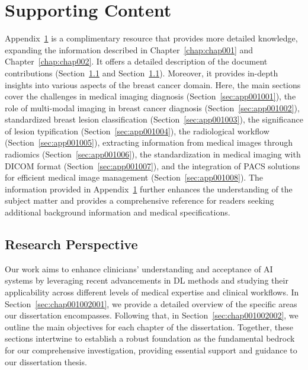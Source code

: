 \chapter{Supporting Content}
\label{chap:app001}

Appendix~\ref{chap:app001} is a complimentary resource that provides more detailed knowledge, expanding the information described in Chapter~\ref{chap:chap001} and Chapter~\ref{chap:chap002}.
It offers a detailed description of the document contributions (Section~\ref{sec:chap001002} and Section~\ref{sec:chap001002}).
Moreover, it provides in-depth insights into various aspects of the breast cancer domain.
Here, the main sections cover the challenges in medical imaging diagnosis (Section~\ref{sec:app001001}), the role of multi-modal imaging in breast cancer diagnosis (Section~\ref{sec:app001002}), standardized breast lesion classification (Section~\ref{sec:app001003}), the significance of lesion typification (Section~\ref{sec:app001004}), the radiological workflow (Section~\ref{sec:app001005}), extracting information from medical images through radiomics (Section~\ref{sec:app001006}), the standardization in medical imaging with \ac{DICOM} format (Section~\ref{sec:app001007}), and the integration of \ac{PACS} solutions for efficient medical image management (Section~\ref{sec:app001008}).
The information provided in Appendix~\ref{chap:app001} further enhances the understanding of the subject matter and provides a comprehensive reference for readers seeking additional background information and medical specifications.

\section{Research Perspective}
\label{sec:chap001002}

Our work aims to enhance clinicians' understanding and acceptance of \ac{AI} systems by leveraging recent advancements in \ac{DL} methods and studying their applicability across different levels of medical expertise and clinical workflows.
In Section~\ref{sec:chap001002001}, we provide a detailed overview of the specific areas our dissertation encompasses.
Following that, in Section~\ref{sec:chap001002002}, we outline the main objectives for each chapter of the dissertation.
Together, these sections intertwine to establish a robust foundation as the fundamental bedrock for our comprehensive investigation, providing essential support and guidance to our dissertation thesis.

